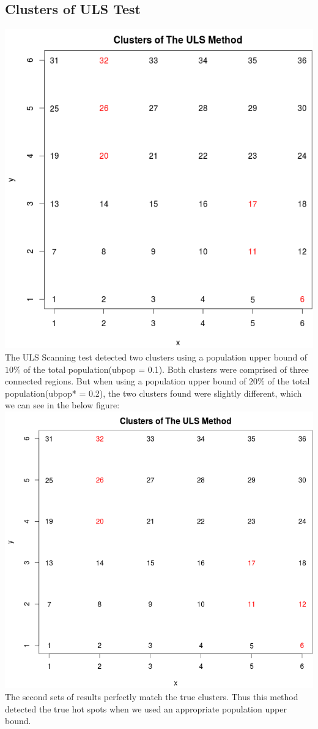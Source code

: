 \documentclass[12pt]{article}
\begin{document}
	\subsection{Clusters of ULS Test}
	 \includegraphics[scale=0.35]{test_2_01} \\ The ULS Scanning test detected two clusters using a population upper bound of $10\%$ of the total population(ubpop = 0.1). Both clusters were comprised of three connected regions. But when using a population upper bound of $20\%$ of the total population(ubpop* = 0.2), the two clusters found were slightly different, which we can see in the below figure:\\
	 
	 \includegraphics[scale=0.3]{test_2}\\ The second sets of results perfectly match the true clusters. Thus this method detected the true hot spots when we used an appropriate population upper bound.  \\ 
	
\end{document}

